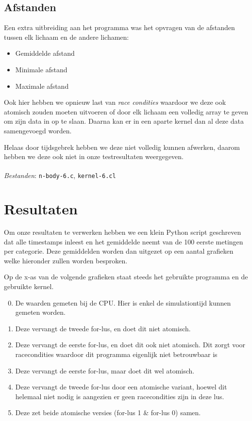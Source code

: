 \documentclass{article}
\begin{document}
\subsection{Afstanden}
Een extra uitbreiding aan het programma was het opvragen van de afstanden tussen
elk lichaam en de andere lichamen:

\begin{itemize}
    \item Gemiddelde afstand
    \item Minimale afstand
    \item Maximale afstand
\end{itemize}

Ook hier hebben we opnieuw last van \textit{race condities} waardoor we deze ook
atomisch zouden moeten uitvoeren of door elk lichaam een volledig array te geven
om zijn data in op te slaan. Daarna kan er in een aparte kernel dan al deze data
samengevoegd worden.

Helaas door tijdsgebrek hebben we deze niet volledig kunnen afwerken, daarom hebben
we deze ook niet in onze testresultaten weergegeven.
\\
\\
\textit{Bestanden}: \texttt{n-body-6.c}, \texttt{kernel-6.cl}


\section{Resultaten}
Om onze resultaten te verwerken hebben we een klein Python script geschreven dat
alle timestamps inleest en het gemiddelde neemt van de 100 eerste metingen per
categorie. Deze gemiddelden worden dan uitgezet op een aantal grafieken welke
hieronder zullen worden besproken.

Op de x-as van de volgende grafieken staat steeds het gebruikte programma en
de gebruikte kernel.
\begin{enumerate}
\setcounter{enumi}{-1}
    \item De waarden gemeten bij de CPU. Hier is enkel de simulationtijd kunnen gemeten worden.
    \item Deze vervangt de tweede for-lus, en doet dit niet atomisch.
    \item Deze vervangt de eerste for-lus, en doet dit ook niet atomisch. Dit zorgt voor
    racecondities waardoor dit programma eigenlijk niet betrouwbaar is
    \item Deze vervangt de eerste for-lus, maar doet dit wel atomisch.
    \item Deze vervangt de tweede for-lus door een atomische variant, hoewel dit helemaal niet
    nodig is aangezien er geen racecondities zijn in deze lus.
    \item Deze zet beide atomische versies (for-lus 1 \& for-lus 0) samen.
\end{enumerate}
\end{document}
